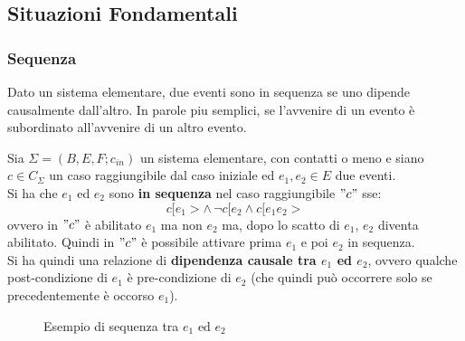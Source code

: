 \subsection{Situazioni Fondamentali}
\subsubsection{Sequenza}
Dato un sistema elementare, due eventi sono in sequenza se uno dipende
causalmente dall’altro. In parole piu semplici, se l’avvenire di un evento è subordinato
all’avvenire di un altro evento.
\begin{definizione}
  Sia $\Sigma = (B, E, F;c_{in})$ un sistema elementare, con contatti o meno
  e siano $c\in C_\Sigma$ un caso raggiungibile dal caso iniziale ed $e_1, e_2\in
  E$ due eventi.\\
  Si ha che $e_1$ ed $e_2$ sono \textbf{in sequenza} nel caso
  raggiungibile $"c"$ sse:
  \[c[e_1>\wedge\, \neg c[e_2\wedge c[e_1e_2>\]
  ovvero in $"c"$ è abilitato $e_1$ ma non $e_2$ ma, dopo lo scatto di $e_1$,
  $e_2$ diventa abilitato. Quindi in $"c"$ è possibile attivare prima $e_1$ e poi
  $e_2$ in sequenza.\\
  Si ha quindi una relazione di \textbf{dipendenza causale tra $e_1$ ed $e_2$},
  ovvero qualche post-condizione di $e_1$ è pre-condizione di $e_2$ (che quindi
  può occorrere solo se precedentemente è occorso $e_1$).
  \begin{figure}[H]
    \centering
    \caption{Esempio di sequenza tra $e_1$ ed $e_2$}
  \end{figure}
\end{definizione} \vspace{5mm} %
